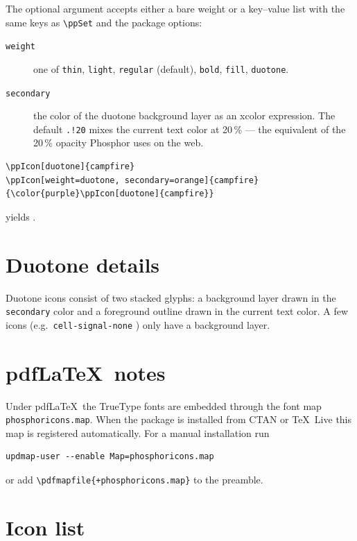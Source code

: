 \documentclass{article}
\begin{document}
The optional argument accepts either a bare weight or a key--value list with
the same keys as \verb|\ppSet| and the package options:

\begin{description}
  \item[\texttt{weight}] one of \texttt{thin}, \texttt{light},
    \texttt{regular} (default), \texttt{bold}, \texttt{fill},
    \texttt{duotone}.
  \item[\texttt{secondary}] the color of the duotone background layer as an
    \textsf{xcolor} expression. The default \texttt{.!20} mixes the current
    text color at 20\,\% --- the equivalent of the 20\,\% opacity Phosphor
    uses on the web.
\end{description}

\begin{lstlisting}
\ppIcon[duotone]{campfire}
\ppIcon[weight=duotone, secondary=orange]{campfire}
{\color{purple}\ppIcon[duotone]{campfire}}
\end{lstlisting}

yields 
{\color{purple}}.

\section{Duotone details}

Duotone icons consist of two stacked glyphs: a background layer drawn in the
\texttt{secondary} color and a foreground outline drawn in the current text
color. A few icons (e.g.\ \texttt{cell-signal-none}
) only have a background layer.

\section{pdf\LaTeX\ notes}

Under pdf\LaTeX\ the TrueType fonts are embedded through the font map
\texttt{phosphoricons.map}. When the package is installed from CTAN or
\TeX~Live this map is registered automatically. For a manual installation run
\begin{lstlisting}
updmap-user --enable Map=phosphoricons.map
\end{lstlisting}
or add \verb|\pdfmapfile{+phosphoricons.map}| to the preamble.

\clearpage
\section{Icon list}
\end{document}
